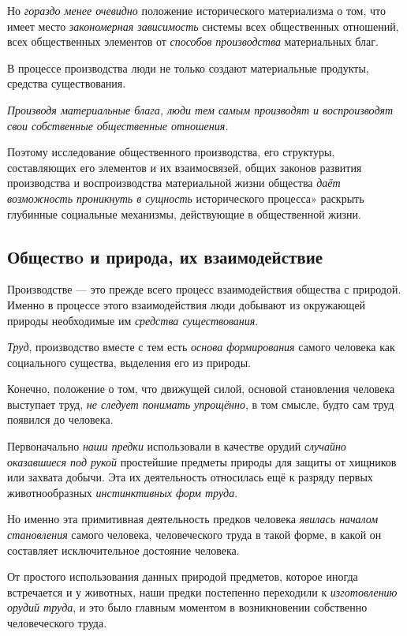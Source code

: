 \documentclass[a4paper,14pt,russian]{extreport}
\begin{document}
Но \emph{гораздо менее очевидно} положение исторического материализма о том, что имеет место \emph{закономерная зависимость} системы всех общественных отношений, всех общественных элементов от \emph{способов производства} материальных благ.

В процессе производства люди не только создают материальные продукты, средства существования.

\emph{Производя материальные блага, люди тем самым производят и воспроизводят свои собственные общественные отношения.}

Поэтому исследование общественного производства, его структуры, составляющих его элементов и их взаимосвязей, общих законов развития производства и воспроизводства материальной жизни общества \emph{даёт возможность проникнуть в сущность} исторического процесса» раскрыть глубинные социальные механизмы, действующие в общественной жизни.

\subsection{Обществo и природа, их взаимодействие}

Производстве --- это прежде всего процесс взаимодействия общества с природой. Именно в процессе этого взаимодействия люди добывают из окружающей природы необходимые им \emph{средства существования}.

\emph{Труд}, производство вместе с тем есть \emph{основа формирования} самого человека как социального существа, выделения его из природы.

Конечно, положение о том, что движущей силой, основой становления человека выступает труд, \emph{не следует понимать упрощённо}, в том смысле, будто сам труд появился до человека.

Первоначально \emph{наши предки} использовали в качестве орудий \emph{случайно оказавшиеся под рукой} простейшие предметы природы для защиты от хищников или захвата добычи. Эта их деятельность относилась ещё к разряду первых животнообразных \emph{инстинктивных форм труда}.

Но именно эта примитивная деятельность предков человека \emph{явилась началом} \emph{становления} самого человека, человеческого труда в такой форме, в какой он составляет исключительное достояние человека.

От простого использования данных природой предметов, которое иногда встречается и у животных, наши предки постепенно переходили к \emph{изготовлению орудий труда}, и это было главным моментом в возникновении собственно человеческого труда.
\end{document}
